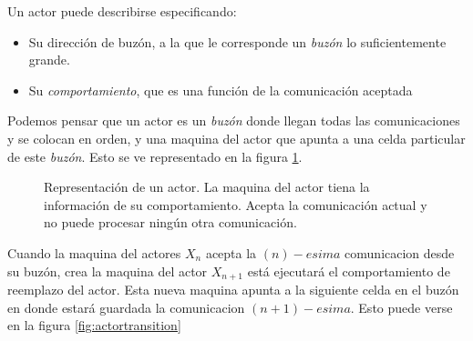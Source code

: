 Un actor puede describirse especificando:

\begin{itemize}
 \item Su dirección de buzón, a la que le corresponde un \textit{buzón} lo suficientemente grande.
 \item Su \textit{comportamiento}, que es una función de la comunicación aceptada
\end{itemize}

Podemos pensar que un actor es un \textit{buzón} donde llegan todas las comunicaciones y se colocan en orden, y una maquina del actor que apunta a una celda particular de este \textit{buzón}. Esto se ve representado en la figura \ref{fig:mailqueue}.

\begin{figure}[H]
\caption{Representación de un actor. La maquina del actor tiena la información de su comportamiento. Acepta la comunicación actual y no puede procesar ningún otra comunicación.}
\label{fig:mailqueue}
\end{figure}

Cuando la maquina del actores $X_n$ acepta la $(n)-esima$ comunicacion desde su buzón, crea la maquina del actor $X_{n+1}$ está ejecutará el comportamiento de reemplazo del actor. Esta nueva maquina apunta a la siguiente celda en el buzón en donde estará guardada la comunicacion $(n+1)-esima$. Esto puede verse en la figura \ref{fig:actortransition}


